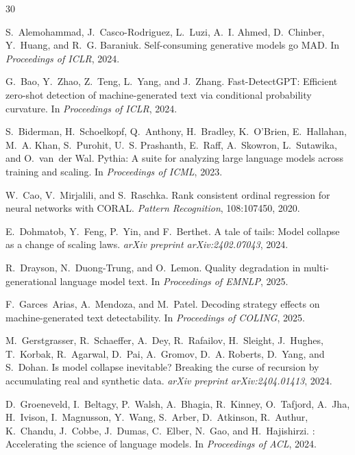 \documentclass[11pt,a4paper]{article}
\begin{document}
\begin{thebibliography}{30}

S.~Alemohammad, J.~Casco-Rodriguez, L.~Luzi, A.~I. Ahmed, D.~Chinber,
  Y.~Huang, and R.~G. Baraniuk.
\newblock Self-consuming generative models go {MAD}.
\newblock In \emph{Proceedings of ICLR}, 2024.

G.~Bao, Y.~Zhao, Z.~Teng, L.~Yang, and J.~Zhang.
\newblock Fast-{DetectGPT}: Efficient zero-shot detection of machine-generated text via conditional probability curvature.
\newblock In \emph{Proceedings of ICLR}, 2024.

S.~Biderman, H.~Schoelkopf, Q.~Anthony, H.~Bradley, K.~O'Brien, E.~Hallahan,
  M.~A. Khan, S.~Purohit, U.~S. Prashanth, E.~Raff, A.~Skowron, L.~Sutawika,
  and O.~van~der Wal.
\newblock Pythia: A suite for analyzing large language models across training and scaling.
\newblock In \emph{Proceedings of ICML}, 2023.

W.~Cao, V.~Mirjalili, and S.~Raschka.
\newblock Rank consistent ordinal regression for neural networks with {CORAL}.
\newblock \emph{Pattern Recognition}, 108:107450, 2020.

E.~Dohmatob, Y.~Feng, P.~Yin, and F.~Berthet.
\newblock A tale of tails: Model collapse as a change of scaling laws.
\newblock \emph{arXiv preprint arXiv:2402.07043}, 2024.

R.~Drayson, N.~Duong-Trung, and O.~Lemon.
\newblock Quality degradation in multi-generational language model text.
\newblock In \emph{Proceedings of EMNLP}, 2025.

F.~Garces~Arias, A.~Mendoza, and M.~Patel.
\newblock Decoding strategy effects on machine-generated text detectability.
\newblock In \emph{Proceedings of COLING}, 2025.

M.~Gerstgrasser, R.~Schaeffer, A.~Dey, R.~Rafailov, H.~Sleight, J.~Hughes,
  T.~Korbak, R.~Agarwal, D.~Pai, A.~Gromov, D.~A. Roberts, D.~Yang, and
  S.~Dohan.
\newblock Is model collapse inevitable? {B}reaking the curse of recursion by accumulating real and synthetic data.
\newblock \emph{arXiv preprint arXiv:2404.01413}, 2024.

D.~Groeneveld, I.~Beltagy, P.~Walsh, A.~Bhagia, R.~Kinney, O.~Tafjord,
  A.~Jha, H.~Ivison, I.~Magnusson, Y.~Wang, S.~Arber, D.~Atkinson,
  R.~Authur, K.~Chandu, J.~Cobbe, J.~Dumas, C.~Elber, N.~Gao, and
  H.~Hajishirzi.
: Accelerating the science of language models.
\newblock In \emph{Proceedings of ACL}, 2024.


\end{thebibliography}
\end{document}
